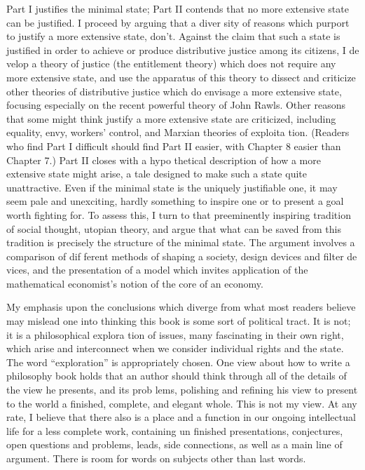 \documentclass[11pt,openany]{book}
\begin{document}
Part I justifies the minimal state; Part II contends that no more extensive state can be justified. I proceed by arguing that a diver sity of reasons which purport to justify a more extensive state, don't. Against the claim that such a state is justified in order to achieve or produce distributive justice among its citizens, I de velop a theory of justice (the entitlement theory) which does not require any more extensive state, and use the apparatus of this theory to dissect and criticize other theories of distributive justice which do envisage a more extensive state, focusing especially on the recent powerful theory of John Rawls. Other reasons that some might think justify a more extensive state are criticized, including equality, envy, workers' control, and Marxian theories of exploita tion. (Readers who find Part I difficult should find Part II easier, with Chapter 8 easier than Chapter 7.) Part II closes with a hypo thetical description of how a more extensive state might arise, a tale designed to make such a state quite unattractive. Even if the minimal state is the uniquely justifiable one, it may seem pale and unexciting, hardly something to inspire one or to present a goal worth fighting for. To assess this, I turn to that preeminently inspiring tradition of social thought, utopian theory, and argue that what can be saved from this tradition is precisely the structure of the minimal state. The argument involves a comparison of dif ferent methods of shaping a society, design devices and filter de vices, and the presentation of a model which invites application of the mathematical economist's notion of the core of an economy. 

My emphasis upon the conclusions which diverge from what most readers believe may mislead one into thinking this book is some sort of political tract. It is not; it is a philosophical explora tion of issues, many fascinating in their own right, which arise and interconnect when we consider individual rights and the state. The word ``exploration'' is appropriately chosen. One view about how to write a philosophy book holds that an author should think through all of the details of the view he presents, and its prob lems, polishing and refining his view to present to the world a finished, complete, and elegant whole. This is not my view. At any rate, I believe that there also is a place and a function in our ongoing intellectual life for a less complete work, containing un finished presentations, conjectures, open questions and problems, leads, side connections, as well as a main line of argument. There is room for words on subjects other than last words. 
\end{document}
